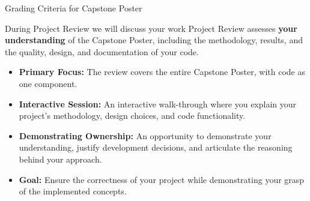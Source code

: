 \begin{frame}[t]{Grading Criteria for Capstone Poster}
    
\end{frame}

\begin{frame}[t]{During Project Review we will discuss your work}
    Project Review assesses \textbf{your understanding} of the Capstone Poster, including the methodology, results, and the quality, design, and documentation of your code.
    \vspace{1em}
    
    \small
    \begin{itemize}
        \item \textbf{Primary Focus:} The review covers the entire Capstone Poster, with code as one component. 
        \item \textbf{Interactive Session:} An interactive walk-through where you explain your project's methodology, design choices, and code functionality.
        \item \textbf{Demonstrating Ownership:} An opportunity to demonstrate your understanding, justify development decisions, and articulate the reasoning behind your approach.
        \item \textbf{Goal:} Ensure the correctness of your project while demonstrating your grasp of the implemented concepts.
    \end{itemize}
\end{frame}

